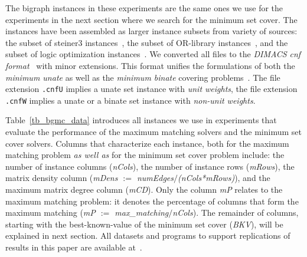 The bigraph instances in these experiments are the same ones we use for 
the experiments in the next section where we search for the minimum set cover.
The instances have been assembled as larger  instance subsets from variety of 
sources:
the subset of steiner3 instances~\cite{OPUS-setc-2021-Resende-steiner3_data},
the subset of OR-library instances~\cite{OPUS-setc-2014-orlib-Beasley},
and the subset of logic optimization instances~\cite{OPUS2-1993-benchm-Logic_synthesis}.
We converted all files to
the {\it DIMACS cnf format}~\cite{OPUS-cnf-2021-wiki}
with minor extensions.
This format unifies the formulations
of both the  {\it minimum unate} as well as the {\it minimum binate} covering
problems~\cite{OPUS2-2005-cover-DAC-Li}.
The file extension {\tt .cnfU} implies a unate set instance
with {\it unit weights}, the file extension {\tt .cnfW} implies a unate 
or a binate set instance with {\it non-unit weights}.




Table~\ref{tb_bgmc_data} introduces all instances
we use in experiments that evaluate the performance of
the maximum matching solvers and 
the minimum set cover solvers.
Columns that characterize each instance,
both for the maximum matching problem {\it as well as} for
the minimum set cover problem include:
the number of instance columns ({\it nCols}), 
the number of instance rows ({\it mRows}), 
the matrix density column  
({\it mDens $:=$ numEdges$/$(nCols*mRows)}), and
the maximum matrix degree column  ({\it mCD}).
Only the column {\it mP} relates to  
the maximum matching problem: it
denotes the percentage of columns that form the maximum matching
({\it mP $:=$ max\_matching$/$nCols}).
%
The remainder of columns, starting with the 
best-known-value of the minimum set cover ({\it BKV}), will be explained
in next section. All datasets and programs to support
replications of results in this paper are available
at~\cite{OPUS-github-rBedPlus-bgmc}.




